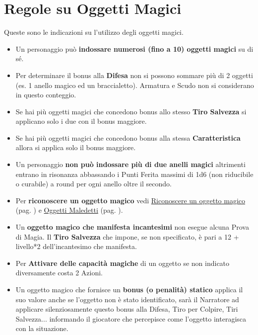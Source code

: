 \section{Regole su Oggetti Magici}\hypertarget{identificareom}{}\label{regoleoggettimagici}\hypertarget{regoleoggettimagici}{}

\begin{multicols}{2}

Queste sono le indicazioni su l'utilizzo degli oggetti magici.

\label{oggetti-magici}
\begin{itemize}[leftmargin=*] \setlength{\itemsep}{0pt}
\item
Un personaggio può \textbf{indossare numerosi (fino a 10) oggetti magici} su di sé.

\item Per determinare il bonus alla \textbf{Difesa} non si possono sommare più di 2 oggetti (es. 1 anello magico ed un braccialetto). Armatura e Scudo non si considerano in questo conteggio.
\item
Se hai più oggetti magici che concedono bonus allo stesso \textbf{Tiro Salvezza} si applicano solo i due con il bonus maggiore.
\item
Se hai più oggetti magici che concedono bonus alla stessa \textbf{Caratteristica} allora si applica solo il bonus maggiore.
\item
Un personaggio \textbf{non può indossare più di due anelli magici} altrimenti entrano in risonanza abbassando i Punti Ferita massimi di 1d6 (non riducibile o curabile) a round per ogni anello oltre il secondo.
\item
Per \textbf{riconoscere un oggetto magico} vedi \hyperlink{rinoscereoggettomagico}{Riconoscere un oggetto magico} (pag. \pageref{rinoscereoggettomagico}) e \hyperlink{oggettimaledettiid}{Oggetti Maledetti} (pag. \pageref{oggettimaledettiid}).
\item
Un \textbf{oggetto magico che manifesta incantesimi} non esegue alcuna Prova di Magia. Il \textbf{Tiro Salvezza} che impone, se non specificato, è pari a 12 + livello*2 dell'incantesimo che manifesta.\label{tirosalvezzaincoggetto}
\item
Per \textbf{Attivare delle capacità magiche} di un oggetto se non indicato diversamente  costa 2 Azioni.
\item
Un oggetto magico che fornisce un \textbf{bonus (o penalità) statico} applica il suo valore anche se l'oggetto non è stato identificato, sarà il Narratore ad applicare silenziosamente questo bonus alla Difesa, Tiro per Colpire, Tiri Salvezza... informando il giocatore che percepisce come l'oggetto interagisca con la situazione.

\end{itemize}
\end{multicols}
